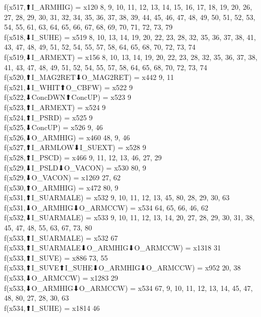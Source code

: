 f(x517,⬆I_ARMHIG) = x120 {8, 9, 10, 11, 12, 13, 14, 15, 16, 17, 18, 19, 20, 26, 27, 28, 29, 30, 31, 32, 34, 35, 36, 37, 38, 39, 44, 45, 46, 47, 48, 49, 50, 51, 52, 53, 54, 55, 61, 63, 64, 65, 66, 67, 68, 69, 70, 71, 72, 73, 79} \\
f(x518,⬇I_SUHE) = x519 {8, 10, 13, 14, 19, 20, 22, 23, 28, 32, 35, 36, 37, 38, 41, 43, 47, 48, 49, 51, 52, 54, 55, 57, 58, 64, 65, 68, 70, 72, 73, 74} \\
f(x519,⬇I_ARMEXT) = x156 {8, 10, 13, 14, 19, 20, 22, 23, 28, 32, 35, 36, 37, 38, 41, 43, 47, 48, 49, 51, 52, 54, 55, 57, 58, 64, 65, 68, 70, 72, 73, 74} \\
f(x520,⬆I_MAG2RET⬇O_MAG2RET) = x442 {9, 11} \\
f(x521,⬇I_WHIT⬆O_CBFW) = x522 {9} \\
f(x522,⬇ConcDWN⬆ConcUP) = x523 {9} \\
f(x523,⬆I_ARMEXT) = x524 {9} \\
f(x524,⬆I_PSRD) = x525 {9} \\
f(x525,⬇ConcUP) = x526 {9, 46} \\
f(x526,⬇O_ARMHIG) = x460 {48, 9, 46} \\
f(x527,⬆I_ARMLOW⬇I_SUEXT) = x528 {9} \\
f(x528,⬆I_PSCD) = x466 {9, 11, 12, 13, 46, 27, 29} \\
f(x529,⬇I_PSLD⬇O_VACON) = x530 {80, 9} \\
f(x529,⬇O_VACON) = x1269 {27, 62} \\
f(x530,⬆O_ARMHIG) = x472 {80, 9} \\
f(x531,⬆I_SUARMALE) = x532 {9, 10, 11, 12, 13, 45, 80, 28, 29, 30, 63} \\
f(x531,⬇O_ARMHIG⬇O_ARMCCW) = x534 {64, 65, 66, 46, 62} \\
f(x532,⬇I_SUARMALE) = x533 {9, 10, 11, 12, 13, 14, 20, 27, 28, 29, 30, 31, 38, 45, 47, 48, 55, 63, 67, 73, 80} \\
f(x533,⬆I_SUARMALE) = x532 {67} \\
f(x533,⬆I_SUARMALE⬇O_ARMHIG⬇O_ARMCCW) = x1318 {31} \\
f(x533,⬆I_SUVE) = x886 {73, 55} \\
f(x533,⬆I_SUVE⬆I_SUHE⬇O_ARMHIG⬇O_ARMCCW) = x952 {20, 38} \\
f(x533,⬇O_ARMCCW) = x1283 {29} \\
f(x533,⬇O_ARMHIG⬇O_ARMCCW) = x534 {67, 9, 10, 11, 12, 13, 14, 45, 47, 48, 80, 27, 28, 30, 63} \\
f(x534,⬆I_SUHE) = x1814 {46} \\
